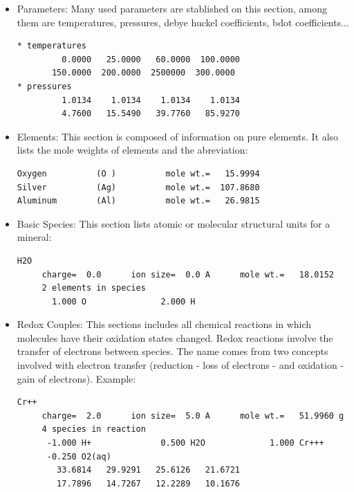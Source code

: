 \begin{enumerate}
\begin{itemize}
\item Parameters: Many used parameters are stablished on this section, among them are temperatures, pressures, debye huckel coefficients, bdot coefficients...
\begin{lstlisting}[frame=single, caption=Excerpt of the section Parameters]
* temperatures
         0.0000   25.0000   60.0000  100.0000
       150.0000  200.0000  2500000  300.0000
* pressures
         1.0134    1.0134    1.0134    1.0134
         4.7600   15.5490   39.7760   85.9270
\end{lstlisting}
\item Elements: This section is composed of information on pure elements. It also lists the mole weights of elements and the abreviation: 
\begin{lstlisting}[frame=single, caption=Excerpt of the section Elements]
Oxygen          (O )          mole wt.=   15.9994
Silver          (Ag)          mole wt.=  107.8680
Aluminum        (Al)          mole wt.=   26.9815
\end{lstlisting}
\item Basic Species: This section lists atomic or molecular structural units for a mineral:
\begin{lstlisting}[frame=single, caption=Excerpt of the section Basic Species]
H2O
     charge=  0.0      ion size=  0.0 A      mole wt.=   18.0152
     2 elements in species
       1.000 O               2.000 H
\end{lstlisting}


\item Redox Couples: This sections includes all chemical reactions in which molecules have their oxidation states changed. 
Redox reactions involve the transfer of electrons between species.
The name comes from two concepts involved with electron transfer (reduction - loss of electrons - and oxidation - gain of electrons). Example:

\begin{minipage}[c]{0.92\textwidth}
\begin{lstlisting}[frame=single, caption=Excerpt of the section Redox Couples]
Cr++
     charge=  2.0      ion size=  5.0 A      mole wt.=   51.9960 g
     4 species in reaction
      -1.000 H+              0.500 H2O             1.000 Cr+++
      -0.250 O2(aq)
        33.6814   29.9291   25.6126   21.6721
        17.7896   14.7267   12.2289   10.1676
\end{lstlisting}
\end{minipage}



\end{itemize}
\end{enumerate}
